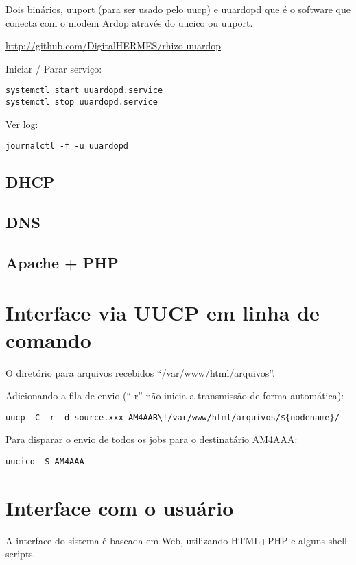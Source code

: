 \documentclass[11pt,a4paper]{article}
\begin{document}
Dois binários, uuport (para ser usado pelo uucp) e uuardopd que é o software
que conecta com o modem Ardop através do uucico ou uuport.

\url{http://github.com/DigitalHERMES/rhizo-uuardop}


Iniciar / Parar serviço:
\begin{verbatim}
systemctl start uuardopd.service
systemctl stop uuardopd.service
\end{verbatim}


Ver log:
\begin{verbatim}
journalctl -f -u uuardopd
\end{verbatim}

\subsection{DHCP}

\subsection{DNS}

\subsection{Apache + PHP}

\section{Interface via UUCP em linha de comando}

O diretório para arquivos recebidos ``/var/www/html/arquivos''.

Adicionando a fila de envio (``-r'' não inicia a transmissão de forma
automática):
\begin{verbatim}
uucp -C -r -d source.xxx AM4AAB\!/var/www/html/arquivos/${nodename}/
\end{verbatim}

Para disparar o envio de todos os jobs para o destinatário
AM4AAA:
\begin{verbatim}
uucico -S AM4AAA
\end{verbatim}


\section{Interface com o usuário}

A interface do sistema é baseada em Web, utilizando HTML+PHP e
alguns shell scripts.
\end{document}
